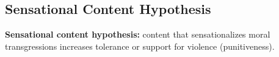 \subsection{Sensational Content Hypothesis}

\vspace{1em}
\noindent\textbf{Sensational content hypothesis:} content that sensationalizes moral transgressions increases tolerance or support for violence (punitiveness).
\vspace{1em}

